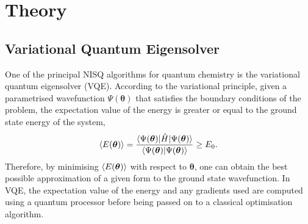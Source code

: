 \documentclass[%
 reprint,
 amsmath,amssymb,
 aps,
]{revtex4-2}
\begin{document}
\section{Theory}

\subsection{Variational Quantum Eigensolver}

One of the principal NISQ algorithms for quantum chemistry is the variational quantum eigensolver (VQE).\cite{Peruzzo2014} According to the variational principle, given a parametrised wavefunction $\Psi(\boldsymbol{\theta})$ that satisfies the boundary conditions of the problem, the expectation value of the energy is greater or equal to the ground state energy of the system,
\begin{equation}
\braket{E(\boldsymbol{\theta})} = \frac{\braket{\Psi(\boldsymbol\theta)|\hat H | \Psi(\boldsymbol{\theta})}}{\braket{\Psi(\boldsymbol{\theta})| \Psi(\boldsymbol{\theta})}} \geq E_0.
\end{equation}
Therefore, by minimising $\braket{E(\boldsymbol{\theta})}$ with respect to $\boldsymbol{\theta}$, one can obtain the best possible approximation of a given form to the ground state wavefunction.
In VQE, the expectation value of the energy and any gradients used are computed using a quantum processor before being passed on to a classical optimisation algorithm.
\end{document}
